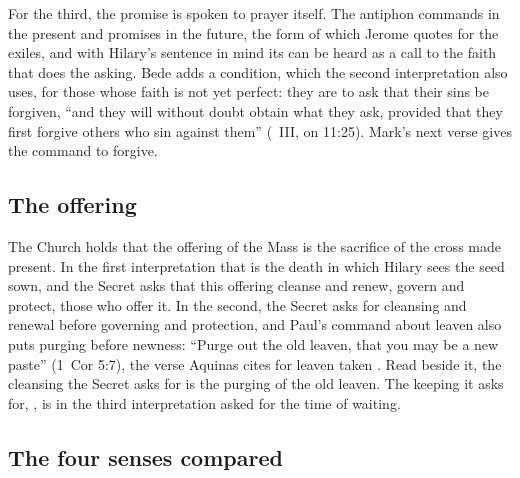 For the third, the promise is spoken to prayer itself. The antiphon commands in
the present and promises in the future, the form of  which Jerome quotes for the exiles, and with Hilary's sentence in
mind its  can be heard as a call to the faith that does the
asking. Bede adds a condition, which the second interpretation also uses, for
those whose faith is not yet perfect: they are to ask that their sins be
forgiven, ``and they will without doubt obtain what they ask, provided that
they first forgive others who sin against them'' (~III, on
11:25). Mark's next verse gives the command to
forgive.

\subsection{The offering}

The Church holds that the offering of the Mass is the sacrifice of the cross
made present. In the first interpretation that is the death in which Hilary
sees the seed sown, and the Secret asks that this offering cleanse and renew,
govern and protect, those who offer it. In the second, the Secret asks for cleansing
and renewal before governing and protection, and Paul's command about leaven
also puts purging before newness: ``Purge out the old leaven, that you may be
a new paste'' (1~Cor 5:7), the verse Aquinas cites for leaven taken
. Read beside it, the cleansing the Secret asks for is the
purging of the old leaven. The keeping it asks for, , is in the third interpretation asked for the time of waiting.

\subsection{The four senses compared}

